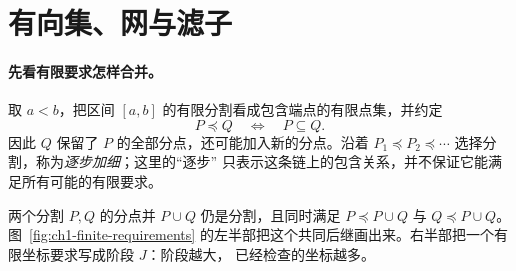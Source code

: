 \section{有向集、网与滤子}
\label{ch1:sec:tails-neighborhoods}

\paragraph{先看有限要求怎样合并。}
取 $a<b$，把区间 $[a,b]$ 的有限分割看成包含端点的有限点集，并约定
\[
 P\preceq Q\quad\Longleftrightarrow\quad P\subseteq Q.
\]
因此 $Q$ 保留了 $P$ 的全部分点，还可能加入新的分点。沿着
$P_1\preceq P_2\preceq\cdots$ 选择分割，称为\emph{逐步加细}；这里的“逐步”
只表示这条链上的包含关系，并不保证它能满足所有可能的有限要求。

两个分割 $P,Q$ 的分点并 $P\cup Q$ 仍是分割，且同时满足
$P\preceq P\cup Q$ 与 $Q\preceq P\cup Q$。图~\ref{fig:ch1-finite-requirements}
的左半部把这个共同后继画出来。右半部把一个有限坐标要求写成阶段 $J$：阶段越大，
已经检查的坐标越多。

